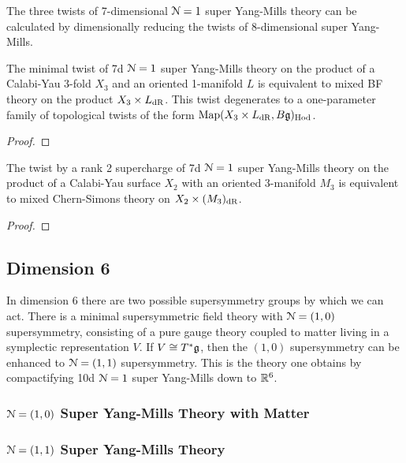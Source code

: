 \documentclass[10pt, oneside]{article}
\begin{document}
The three twists of 7-dimensional $\mathcal{N}=1$ super Yang-Mills theory can be calculated by dimensionally reducing the twists of 8-dimensional super Yang-Mills.

\begin{theorem} \label{7d_holo_twist_thm}
The minimal twist of 7d $\mathcal{N}=1$ super Yang-Mills theory on the product of a Calabi-Yau 3-fold $X_3$ and an oriented 1-manifold $L$ is equivalent to mixed BF theory on the product $X_3 \times L_{\mathrm{dR}}$. This twist degenerates to a one-parameter family of topological twists of the form $\operatorname{Map}(X_3 \times L_{\mathrm{dR}}, B\mathfrak{g})_{\mathrm{Hod}}$.
\end{theorem}

\begin{proof}
 
\end{proof}

\begin{theorem} \label{7d_rank2_twist_thm}
The twist by a rank 2 supercharge of 7d $\mathcal{N}=1$ super Yang-Mills theory on the product of a Calabi-Yau surface $X_2$ with an oriented 3-manifold $M_3$ is equivalent to mixed Chern-Simons theory on $X_2 \times (M_3)_{\mathrm{dR}}$. 
\end{theorem}

\begin{proof}
 
\end{proof}

\subsection{Dimension 6}
In dimension 6 there are two possible supersymmetry groups by which we can act.  There is a minimal supersymmetric field theory with $\mathcal{N}=(1,0)$ supersymmetry, consisting of a pure gauge theory coupled to matter living in a symplectic representation $V$.  If $V \cong T^*\mathfrak{g}$, then the $(1,0)$ supersymmetry can be enhanced to $\mathcal{N}=(1,1)$ supersymmetry.  This is the theory one obtains by compactifying 10d $\mathcal{N}=1$ super Yang-Mills down to $\mathbb R^6$.

\subsubsection{$\mathcal{N} = (1,0)$ Super Yang-Mills Theory with Matter}

\subsubsection{$\mathcal{N} = (1,1)$ Super Yang-Mills Theory}
\end{document}
